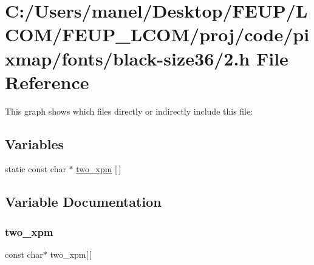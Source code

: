 \hypertarget{black-size36_22_8h}{}\section{C\+:/\+Users/manel/\+Desktop/\+F\+E\+U\+P/\+L\+C\+O\+M/\+F\+E\+U\+P\+\_\+\+L\+C\+O\+M/proj/code/pixmap/fonts/black-\/size36/2.h File Reference}
\label{black-size36_22_8h}
This graph shows which files directly or indirectly include this file\+:
\subsection*{Variables}
\begin{DoxyCompactItemize}
\item 
static const char $\ast$ \mbox{\hyperlink{black-size36_22_8h_affdbae478c3b512e342d6eb22862a0cc}{two\+\_\+xpm}} \mbox{[}$\,$\mbox{]}
\end{DoxyCompactItemize}


\subsection{Variable Documentation}
\mbox{\label{black-size36_22_8h_affdbae478c3b512e342d6eb22862a0cc}} 
\subsubsection{\texorpdfstring{two\_xpm}{two\_xpm}}
{\footnotesize\ttfamily const char$\ast$ two\+\_\+xpm\mbox{[}$\,$\mbox{]}\hspace{0.3cm}{\ttfamily [static]}}

